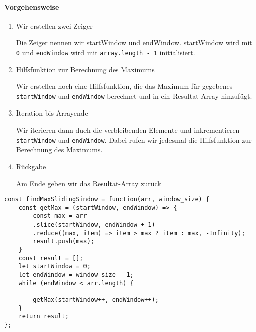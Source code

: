 \documentclass[babel]{book}
\begin{document}
\paragraph{Vorgehensweise}
\begin{enumerate} 
	\item Wir erstellen zwei Zeiger
	
	Die Zeiger nennen wir startWindow und endWindow. startWindow wird mit \lstinline|0| und \lstinline|endWindow| wird mit \lstinline|array.length - 1| initialisiert. 
	
	\item Hilfsfunktion zur Berechnung des Maximums
	
	Wir erstellen noch eine Hilfsfunktion, die das Maximum für gegebenes \lstinline|startWindow| und \lstinline|endWindow| berechnet und in ein Resultat-Array hinzufügt.
	
	\item Iteration bis Arrayende
	
	Wir iterieren dann duch die verbleibenden Elemente und inkrementieren \lstinline|startWindow| und \lstinline|endWindow|. Dabei rufen wir jedesmal die Hilfsfunktion zur Berechnung des Maximums.
	
	\item Rückgabe
	
	Am Ende geben wir das Resultat-Array zurück
\end{enumerate}

\begin{lstlisting}[caption=My Javascript Example]
const findMaxSlidingSindow = function(arr, window_size) {
	const getMax = (startWindow, endWindow) => {
		const max = arr
		.slice(startWindow, endWindow + 1)
		.reduce((max, item) => item > max ? item : max, -Infinity);
		result.push(max);
	}
	const result = [];
	let startWindow = 0;
	let endWindow = window_size - 1;
	while (endWindow < arr.length) {
		
		getMax(startWindow++, endWindow++);    
	}
	return result;
};
\end{lstlisting}
\end{document}
